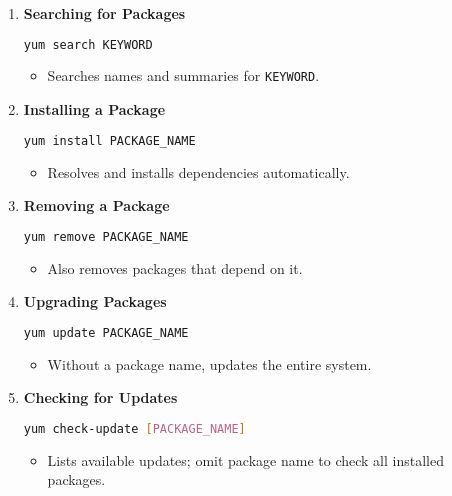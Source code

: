 \documentclass[12pt,a4paper]{report}
\begin{document}
\begin{enumerate}
    \item \textbf{Searching for Packages}
    \begin{lstlisting}[language=bash]
yum search KEYWORD
    \end{lstlisting}
    \begin{itemize}
        \item Searches names and summaries for \texttt{KEYWORD}.
    \end{itemize}

    \item \textbf{Installing a Package}
    \begin{lstlisting}[language=bash]
yum install PACKAGE_NAME
    \end{lstlisting}
    \begin{itemize}
        \item Resolves and installs dependencies automatically.
    \end{itemize}

    \item \textbf{Removing a Package}
    \begin{lstlisting}[language=bash]
yum remove PACKAGE_NAME
    \end{lstlisting}
    \begin{itemize}
        \item Also removes packages that depend on it.
    \end{itemize}

    \item \textbf{Upgrading Packages}
    \begin{lstlisting}[language=bash]
yum update PACKAGE_NAME
    \end{lstlisting}
    \begin{itemize}
        \item Without a package name, updates the entire system.
    \end{itemize}

    \item \textbf{Checking for Updates}
    \begin{lstlisting}[language=bash]
yum check-update [PACKAGE_NAME]
    \end{lstlisting}
    \begin{itemize}
        \item Lists available updates; omit package name to check all installed packages.
    \end{itemize}


\end{enumerate}
\end{document}
